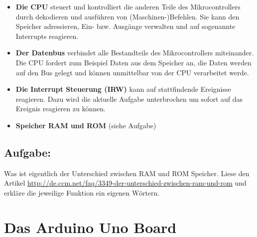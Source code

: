 
\begin{itemize}
  \item \textbf{Die CPU}  steuert und kontrolliert die anderen Teile des Mikrocontrollers durch dekodieren und ausführen von (Maschinen-)Befehlen. Sie kann den Speicher adressieren, Ein- bzw. Ausgänge verwalten und auf sogenannte Interrupts reagieren. 
  \item \textbf{Der Datenbus} verbindet alle Bestandteile des Mikrocontrollers miteinander. Die CPU fordert zum Beispiel Daten aus dem Speicher an, die Daten werden auf den Bus gelegt und können unmittelbar von der CPU verarbeitet werde.
  \item \textbf{Die Interrupt Steuerung (IRW)} kann auf  stattfindende Ereignisse reagieren. Dazu wird die aktuelle Aufgabe unterbrochen um sofort auf das Ereignis  reagieren zu können. 
  \item \textbf{Speicher RAM und ROM} (siehe Aufgabe)
\end{itemize}  

\subsection{Aufgabe:}

Was ist eigentlich der Unterschied zwischen RAM und ROM Speicher. Liese den Artikel \url{http://de.ccm.net/faq/3349-der-unterschied-zwischen-ram-und-rom} und erkläre die jeweilige Funktion ein eigenen Wörtern. 



\clearpage
\section{Das Arduino Uno Board}

